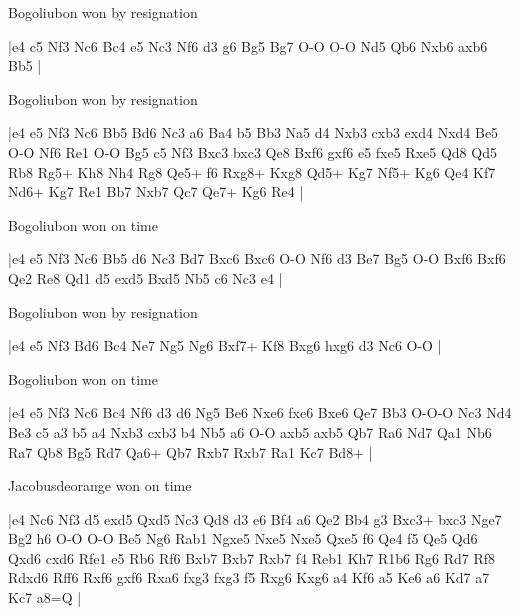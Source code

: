\showboard

Bogoliubon won by resignation

\makegametitle
|e4 c5 Nf3 Nc6 Bc4 e5 Nc3 Nf6 d3 g6 Bg5 Bg7 O-O O-O Nd5 Qb6 Nxb6 axb6 Bb5  |

\showboard

Bogoliubon won by resignation

\makegametitle
|e4 e5 Nf3 Nc6 Bb5 Bd6 Nc3 a6 Ba4 b5 Bb3 Na5 d4 Nxb3 cxb3 exd4 Nxd4 Be5 O-O Nf6 Re1 O-O Bg5 c5 Nf3 Bxc3 bxc3 Qe8 Bxf6 gxf6 e5 fxe5 Rxe5 Qd8 Qd5 Rb8 Rg5+ Kh8 Nh4 Rg8 Qe5+ f6 Rxg8+ Kxg8 Qd5+ Kg7 Nf5+ Kg6 Qe4 Kf7 Nd6+ Kg7 Re1 Bb7 Nxb7 Qc7 Qe7+ Kg6 Re4  |

\showboard

Bogoliubon won on time

\makegametitle
|e4 e5 Nf3 Nc6 Bb5 d6 Nc3 Bd7 Bxc6 Bxc6 O-O Nf6 d3 Be7 Bg5 O-O Bxf6 Bxf6 Qe2 Re8 Qd1 d5 exd5 Bxd5 Nb5 c6 Nc3 e4  |

\showboard

Bogoliubon won by resignation

\makegametitle
|e4 e5 Nf3 Bd6 Bc4 Ne7 Ng5 Ng6 Bxf7+ Kf8 Bxg6 hxg6 d3 Nc6 O-O  |

\showboard

Bogoliubon won on time

\makegametitle
|e4 e5 Nf3 Nc6 Bc4 Nf6 d3 d6 Ng5 Be6 Nxe6 fxe6 Bxe6 Qe7 Bb3 O-O-O Nc3 Nd4 Be3 c5 a3 b5 a4 Nxb3 cxb3 b4 Nb5 a6 O-O axb5 axb5 Qb7 Ra6 Nd7 Qa1 Nb6 Ra7 Qb8 Bg5 Rd7 Qa6+ Qb7 Rxb7 Rxb7 Ra1 Kc7 Bd8+  |

\showboard

Jacobusdeorange won on time

\makegametitle
|e4 Nc6 Nf3 d5 exd5 Qxd5 Nc3 Qd8 d3 e6 Bf4 a6 Qe2 Bb4 g3 Bxc3+ bxc3 Nge7 Bg2 h6 O-O O-O Be5 Ng6 Rab1 Ngxe5 Nxe5 Nxe5 Qxe5 f6 Qe4 f5 Qe5 Qd6 Qxd6 cxd6 Rfe1 e5 Rb6 Rf6 Bxb7 Bxb7 Rxb7 f4 Reb1 Kh7 R1b6 Rg6 Rd7 Rf8 Rdxd6 Rff6 Rxf6 gxf6 Rxa6 fxg3 fxg3 f5 Rxg6 Kxg6 a4 Kf6 a5 Ke6 a6 Kd7 a7 Kc7 a8=Q  |

\showboard

